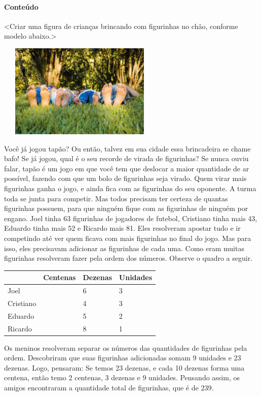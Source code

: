 \paragraph{Conteúdo}\label{conteuxfado-1}

\textless{}Criar uma figura de crianças brincando com figurinhas no
chão, conforme modelo abaixo.\textgreater{}

\includegraphics[width=3.10417in,height=1.76042in]{media/image28.png}

Você já jogou tapão? Ou então, talvez em sua cidade essa brincadeira se
chame bafo! Se já jogou, qual é o seu recorde de virada de figurinhas?
Se nunca ouviu falar, tapão é um jogo em que você tem que deslocar a
maior quantidade de ar possível, fazendo com que um bolo de figurinhas
seja virado. Quem virar mais figurinhas ganha o jogo, e ainda fica com
as figurinhas do seu oponente. A turma toda se junta para competir. Mas
todos precisam ter certeza de quantas figurinhas possuem, para que
ninguém fique com as figurinhas de ninguém por engano. Joel tinha 63
figurinhas de jogadores de futebol, Cristiano tinha mais 43, Eduardo
tinha mais 52 e Ricardo mais 81. Eles resolveram apostar tudo e ir
competindo até ver quem ficava com mais figurinhas no final do jogo. Mas
para isso, eles precisavam adicionar as figurinhas de cada uma. Como
eram muitas figurinhas resolveram fazer pela ordem dos números. Observe
o quadro a seguir.

\begin{longtable}[]{@{}llll@{}}
\toprule
& Centenas & Dezenas & Unidades\tabularnewline
\midrule
\endhead
Joel & & 6 & 3\tabularnewline
Cristiano & & 4 & 3\tabularnewline
Eduardo & & 5 & 2\tabularnewline
Ricardo & & 8 & 1\tabularnewline
\bottomrule
\end{longtable}

Os meninos resolveram separar os números das quantidades de figurinhas
pela ordem. Descobriram que suas figurinhas adicionadas somam 9 unidades
e 23 dezenas. Logo, pensaram: Se temos 23 dezenas, e cada 10 dezenas
forma uma centena, então temo 2 centenas, 3 dezenas e 9 unidades.
Pensando assim, os amigos encontraram a quantidade total de figurinhas,
que é de 239.

